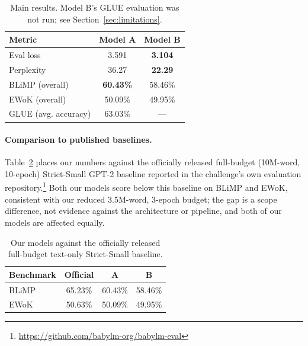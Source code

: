 \documentclass[11pt]{article}
\begin{document}
\begin{table}[t]
\centering
\small
\begin{tabular}{lcc}
\toprule
\textbf{Metric} & \textbf{Model A} & \textbf{Model B} \\
\midrule
Eval loss & 3.591 & \textbf{3.104} \\
Perplexity & 36.27 & \textbf{22.29} \\
BLiMP (overall) & \textbf{60.43\%} & 58.46\% \\
EWoK (overall) & 50.09\% & 49.95\% \\
GLUE (avg. accuracy) & 63.03\% & --- \\
\bottomrule
\end{tabular}
\caption{Main results. Model B's GLUE evaluation was not run; see Section~\ref{sec:limitations}.}
\label{tab:main}
\end{table}

\paragraph{Comparison to published baselines.} Table~\ref{tab:baseline} places our numbers against the officially released full-budget (10M-word, 10-epoch) Strict-Small GPT-2 baseline reported in the challenge's own evaluation repository.\footnote{\url{https://github.com/babylm-org/babylm-eval}} Both our models score below this baseline on BLiMP and EWoK, consistent with our reduced 3.5M-word, 3-epoch budget; the gap is a scope difference, not evidence against the architecture or pipeline, and both of our models are affected equally.

\begin{table}[t]
\centering
\small
\begin{tabular}{lccc}
\toprule
\textbf{Benchmark} & \textbf{Official} & \textbf{A} & \textbf{B} \\
\midrule
BLiMP & 65.23\% & 60.43\% & 58.46\% \\
EWoK & 50.63\% & 50.09\% & 49.95\% \\
\bottomrule
\end{tabular}
\caption{Our models against the officially released full-budget text-only Strict-Small baseline.}
\label{tab:baseline}
\end{table}
\end{document}
